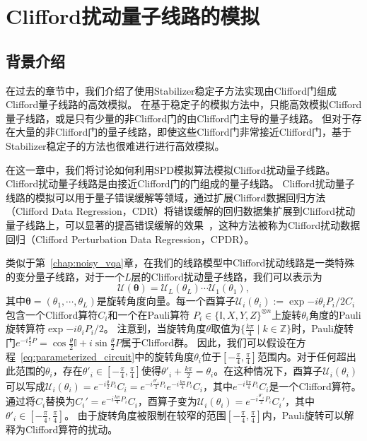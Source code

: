 \chapter{Clifford扰动量子线路的模拟}


\section{背景介绍}
在过去的章节中，我们介绍了使用Stabilizer稳定子方法实现由Clifford门组成Clifford量子线路的高效模拟。
在基于稳定子的模拟方法中，只能高效模拟Clifford量子线路，或是只有少量的非Clifford门的由Clifford门主导的量子线路。
但对于存在大量的非Clifford门的量子线路，即使这些Clifford门非常接近Clifford门，基于Stabilizer稳定子的方法也很难进行进行高效模拟。

在这一章中，我们将讨论如何利用SPD模拟算法模拟Clifford扰动量子线路。Clifford扰动量子线路是由接近Clifford门的门组成的量子线路。
Clifford扰动量子线路的模拟可以用于量子错误缓解等领域，通过扩展Clifford数据回归方法（Clifford Data Regression，CDR）将错误缓解的回归数据集扩展到Clifford扰动量子线路上，可以显著的提高错误缓解的效果~\cite{zhang2024clifford}，这种方法被称为Clifford扰动数据回归（Clifford Perturbation Data Regression，CPDR）。

类似于第~\ref{chap:noisy_vqa}章，在我们的线路模型中Clifford扰动线路是一类特殊的变分量子线路，对于一个$L$层的Clifford扰动量子线路，我们可以表示为
\begin{equation}\label{eq:parameterized_circuit}
    \mathcal{U}(\bm{\theta})=\mathcal{U}_L(\theta_L)  \cdots \mathcal{U}_1(\theta_1),
\end{equation}
其中$\bm{\theta}=(\theta_1,\cdots,\theta_L)$是旋转角度向量。每一个酉算子$\mathcal{U}_i(\theta_i):=\exp{-i \theta_i P_i / 2}C_i $ 包含一个Clifford算符$C_i$和一个在Pauli算符 $P_i\in\{\mathbb{I},X,Y,Z\}^{\otimes n}$上旋转$\theta_i$角度的Pauli旋转算符$\exp{-i \theta_i P_i / 2}$。
注意到，当旋转角度$\theta$取值为$\{\frac{k\pi}{4}\mid k\in \mathbb{Z}\}$时，Pauli旋转门$e^{-i\frac{\theta}{2} P}=\cos{\frac{\theta}{2}}\mathbb{I}+i\sin{\frac{\theta}{2}}P$属于Clifford群。
因此，我们可以假设在方程~\eqref{eq:parameterized_circuit}中的旋转角度$\theta_i$位于$[-\frac{\pi}{4},\frac{\pi}{4}]$范围内。对于任何超出此范围的$\theta_i$，存在$\theta'_i\in [-\frac{\pi}{4},\frac{\pi}{4}]$使得$\theta'_i+\frac{k\pi}{2}=\theta_i$。在这种情况下，酉算子$\mathcal{U}_i(\theta_i)$可以写成$\mathcal{U}_i(\theta_i)=e^{-i\frac{\theta}{2} P_i}C_i=e^{-i\frac{\theta'_i}{2} P_i}e^{-i\frac{k\pi}{4} P_i}C_i$，其中$e^{-i\frac{k\pi}{4} P_i}C_i$是一个Clifford算符。通过将$C_i$替换为$C_i'=e^{-i\frac{k\pi}{4} P_i}C_i$，酉算子变为$\mathcal{U}_i(\theta_i)=e^{-i\frac{\theta'_i}{2} P_i}C_i'$，其中$\theta'_i\in [-\frac{\pi}{4},\frac{\pi}{4}]$。
由于旋转角度被限制在较窄的范围$[-\frac{\pi}{4},\frac{\pi}{4}]$内，Pauli旋转可以解释为Clifford算符的扰动。

